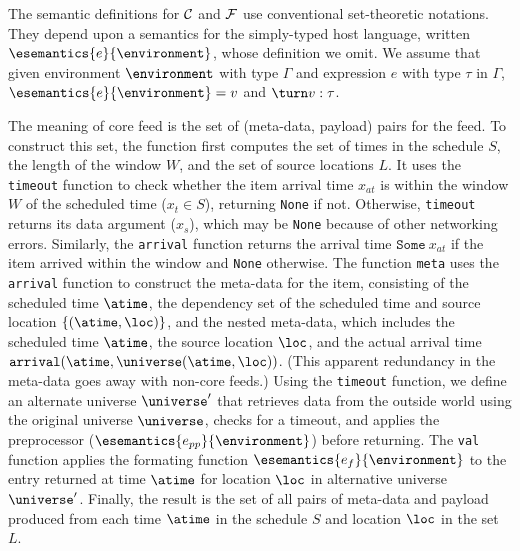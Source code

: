 
The semantic definitions for ${\cal C}$ and ${\cal F}$ use
conventional set-theoretic notations.  They depend upon a
semantics for the simply-typed host language, written
$\esemantics{e}{\environment}$, whose definition we omit. We assume
that given environment $\environment$ with type $\Gamma$ and
expression $e$ with type $\tau$ in $\Gamma$,
$\esemantics{e}{\environment} = v$ and $\turn v : \tau$.

The meaning of core feed \corefeed{} is the set of
(meta-data, payload) pairs for the feed.  To construct this set, the
function first computes the set of times in the schedule $S$, the
length of the window $W$, and the set of source locations $L$.  It
uses the \texttt{timeout} function to check whether the item arrival time
$x_{at}$ is within the window $W$
of the scheduled time ($x_t \in S$), returning \texttt{None} if
not. Otherwise, \texttt{timeout} returns its data argument ($x_s$),
which may be {\tt None} because of other networking errors.  
Similarly, the \texttt{arrival} function returns the arrival time
$\texttt{Some}\ x_{at}$ if the item arrived within the window and 
\texttt{None} otherwise. The function \texttt{meta} uses the 
\texttt{arrival} function to construct the meta-data for the item,
consisting of the scheduled time $\atime$, the dependency set of the scheduled
time and  source location $\{(\atime, \loc)\}$, and the nested
meta-data, which includes the scheduled 
time $\atime$, the source location $\loc$, and the actual arrival time
$\texttt{arrival}(\atime,\universe(\atime,\loc))$. (This apparent
redundancy in the meta-data goes away with non-core feeds.) 
Using the
\texttt{timeout} function, we define an alternate universe
$\universe'$ that retrieves data from the outside world using the
original universe $\universe$, checks for a
timeout, and applies the preprocessor
($\esemantics{e_{pp}}{\environment}$) before returning.  
The \texttt{val} function applies the formating function 
$\esemantics{e_{f}}{\environment}$ to the entry returned at time
$\atime$ for location $\loc$ in alternative universe $\universe'$.
Finally, the result is the set of all pairs of meta-data and payload
produced from each time $\atime$ in the schedule $S$ and location $\loc$
in the set $L$.

